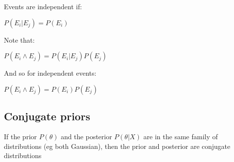 Events are independent if:

\(P(E_i|E_j)=P(E_i)\)

Note that:

\(P(E_i\land E_j)=P(E_i|E_j)P(E_j)\)

And so for independent events:

\(P(E_i\land E_j)=P(E_i)P(E_j)\)

\subsection{Conjugate priors}

If the prior \(P(\theta)\) and the posterior \(P(\theta | X)\) are in the same family of distributions (eg both Gaussian), then the prior and posterior are conjugate distributions

